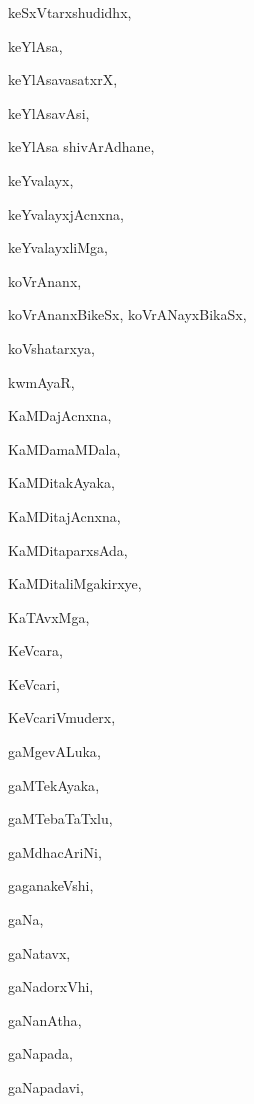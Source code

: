 \begin{multicols}{2}
{keSxVtarxshudidhx}, \pageref{keSxVtarxshudidhx}

{keYlAsa}, \pageref{keYlAsa}

{keYlAsavasatxrX}, \pageref{keYlAsavasatxrX}

{keYlAsavAsi}, \pageref{keYlAsavAsi}

{keYlAsa shivArAdhane}, \pageref{keYlAsa shivArAdhane}

{keYvalayx}, \pageref{keYvalayx}

{keYvalayxjAcnxna}, \pageref{keYvalayxjAcnxna}

{keYvalayxliMga}, \pageref{keYvalayxliMga}

{koVrAnanx}, \pageref{koVrAnanx}

{koVrAnanxBikeSx, koVrANayxBikaSx}, \pageref{koVrAnanxBikeSx, koVrANayxBikaSx}

{koVshatarxya}, \pageref{koVshatarxya}

{kwmAyaR}, \pageref{kwmAyaR}

{KaMDajAcnxna}, \pageref{KaMDajAcnxna}

{KaMDamaMDala}, \pageref{KaMDamaMDala}

{KaMDitakAyaka}, \pageref{KaMDitakAyaka}

{KaMDitajAcnxna}, \pageref{KaMDitajAcnxna}

{KaMDitaparxsAda}, \pageref{KaMDitaparxsAda}

{KaMDitaliMgakirxye}, \pageref{KaMDitaliMgakirxye}

{KaTAvxMga}, \pageref{KaTAvxMga}

{KeVcara}, \pageref{KeVcara}

{KeVcari}, \pageref{KeVcari}

{KeVcariVmuderx}, \pageref{KeVcariVmuderx}

{gaMgevALuka}, \pageref{gaMgevALuka}

{gaMTekAyaka}, \pageref{gaMTekAyaka}

{gaMTebaTaTxlu}, \pageref{gaMTebaTaTxlu}

{gaMdhacAriNi}, \pageref{gaMdhacAriNi}

{gaganakeVshi}, \pageref{gaganakeVshi}

{gaNa}, \pageref{gaNa}

{gaNatavx}, \pageref{gaNatavx}

{gaNadorxVhi}, \pageref{gaNadorxVhi}

{gaNanAtha}, \pageref{gaNanAtha}

{gaNapada}, \pageref{gaNapada}

{gaNapadavi}, \pageref{gaNapadavi}


\end{multicols}
